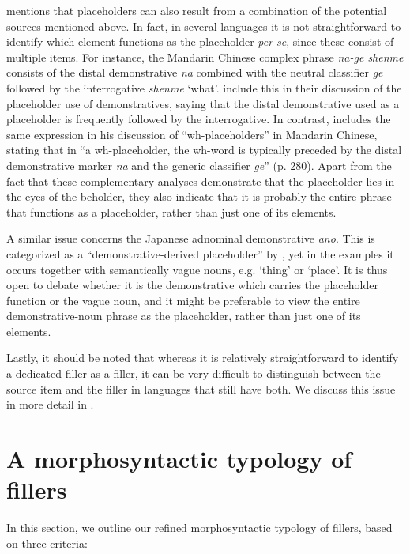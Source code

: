 \documentclass[output=paper]{langscibook}
\begin{document}
\citeauthor{Podlesskaya2010} mentions that placeholders can also result from a combination of the potential sources mentioned above. In fact, in several languages it is not straightforward to identify which element functions as the placeholder \textit{per se}, since these consist of multiple items. For instance, the Mandarin Chinese complex phrase \textit{na-ge shenme} consists of the distal demonstrative \textit{na} combined with the neutral classifier \textit{ge} followed by the interrogative \textit{shenme} ‘what’. \citet[493--494]{Hayashi2006} include this in their discussion of the placeholder use of demonstratives, saying that the distal demonstrative used as a placeholder is frequently followed by the interrogative. In contrast, \citet{Cheung2015} includes the same expression in his discussion of “wh-placeholders” in Mandarin Chinese, stating that in “a wh-placeholder, the wh-word is typically preceded by the distal demonstrative marker \textit{na} and the generic classifier \textit{ge}” (p. 280). Apart from the fact that these complementary analyses demonstrate that the placeholder lies in the eyes of the beholder, they also indicate that it is probably the entire phrase that functions as a placeholder, rather than just one of its elements.

A similar issue concerns the Japanese adnominal demonstrative \textit{ano}. This is categorized as a “demonstrative-derived placeholder” by \citet[120--121]{Seraku2022a}, yet in the examples it occurs together with semantically vague nouns, e.g. ‘thing’ or ‘place’. It is thus open to debate whether it is the demonstrative which carries the placeholder function or the vague noun, and it might be preferable to view the entire demonstrative-noun phrase as the placeholder, rather than just one of its elements.

Lastly, it should be noted that whereas it is relatively straightforward to identify a dedicated filler as a filler, it can be very difficult to distinguish between the source item and the filler in languages that still have both. We discuss this issue in more detail in . 

\section{A morphosyntactic typology of fillers}\label{sec:intro:4}

In this section, we outline our refined morphosyntactic typology of fillers, based on three criteria: 
\end{document}
